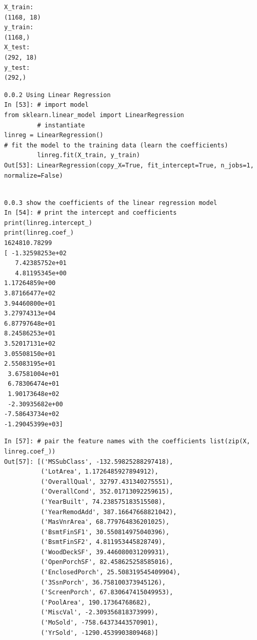 \documentclass[sigconf]{acmart}
\begin{document}
\begin{lstlisting}
X_train:
(1168, 18)
y_train:
(1168,)
X_test:
(292, 18)
y_test:
(292,)
\end{lstlisting}

\begin{lstlisting}
0.0.2 Using Linear Regression
In [53]: # import model
from sklearn.linear_model import LinearRegression
         # instantiate
linreg = LinearRegression()
# fit the model to the training data (learn the coefficients)
         linreg.fit(X_train, y_train)
Out[53]: LinearRegression(copy_X=True, fit_intercept=True, n_jobs=1, normalize=False)


\end{lstlisting}


\begin{lstlisting}
0.0.3 show the coefficients of the linear regression model
In [54]: # print the intercept and coefficients print(linreg.intercept_)
print(linreg.coef_)
1624810.78299
[ -1.32598253e+02
   7.42385752e+01
   4.81195345e+00
1.17264859e+00
3.87166477e+02
3.94460800e+01
3.27974313e+04
6.87797648e+01
8.24586253e+01
3.52017131e+02
3.05508150e+01
2.55083195e+01
 3.67581004e+01   
 6.78306474e+01   
 1.90173648e+02 
 -2.30935682e+00
-7.58643734e+02  
-1.29045399e+03]
\end{lstlisting}

\begin{lstlisting}
In [57]: # pair the feature names with the coefficients list(zip(X, linreg.coef_))
Out[57]: [('MSSubClass', -132.59825288297418),
          ('LotArea', 1.1726485927894912),
          ('OverallQual', 32797.431340275551),
          ('OverallCond', 352.01713092259615),
          ('YearBuilt', 74.238575183515508),
          ('YearRemodAdd', 387.16647668821042),
          ('MasVnrArea', 68.779764836201025),
          ('BsmtFinSF1', 30.550814975040396),
          ('BsmtFinSF2', 4.811953445828749),
          ('WoodDeckSF', 39.446080031209931),
          ('OpenPorchSF', 82.458625258585016),
          ('EnclosedPorch', 25.508319545409904),
          ('3SsnPorch', 36.758100373945126),
          ('ScreenPorch', 67.830647415049953),
          ('PoolArea', 190.17364768682),
          ('MiscVal', -2.309356818373999),
          ('MoSold', -758.64373443570901),
          ('YrSold', -1290.4539903809468)]

\end{lstlisting}
\end{document}
